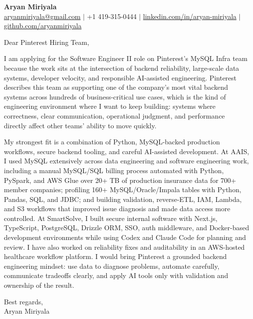 \documentclass[11pt]{letter}
\begin{document}
\begin{center}
{\Large \textbf{Aryan Miriyala}}\\
\href{mailto:aryanmiriyala@gmail.com}{aryanmiriyala@gmail.com} $|$ +1 419-315-0444 $|$
\href{https://www.linkedin.com/in/aryan-miriyala-7788a21b6/}{linkedin.com/in/aryan-miriyala} $|$
\href{https://github.com/aryanmiriyala}{github.com/aryanmiriyala}
\end{center}

\vspace{0.25in}

Dear Pinterest Hiring Team,

I am applying for the Software Engineer II role on Pinterest's MySQL Infra team because the work sits at the intersection of backend reliability, large-scale data systems, developer velocity, and responsible AI-assisted engineering. Pinterest describes this team as supporting one of the company's most vital backend systems across hundreds of business-critical use cases, which is the kind of engineering environment where I want to keep building: systems where correctness, clear communication, operational judgment, and performance directly affect other teams' ability to move quickly.

My strongest fit is a combination of Python, MySQL-backed production workflows, secure backend tooling, and careful AI-assisted development. At AAIS, I used MySQL extensively across data engineering and software engineering work, including a manual MySQL/SQL billing process automated with Python, PySpark, and AWS Glue over 20+ TB of production insurance data for 700+ member companies; profiling 160+ MySQL/Oracle/Impala tables with Python, Pandas, SQL, and JDBC; and building validation, reverse-ETL, IAM, Lambda, and S3 workflows that improved issue diagnosis and made data access more controlled. At SmartSolve, I built secure internal software with Next.js, TypeScript, PostgreSQL, Drizzle ORM, SSO, auth middleware, and Docker-based development environments while using Codex and Claude Code for planning and review. I have also worked on reliability fixes and auditability in an AWS-hosted healthcare workflow platform. I would bring Pinterest a grounded backend engineering mindset: use data to diagnose problems, automate carefully, communicate tradeoffs clearly, and apply AI tools only with validation and ownership of the result.

\vspace{0.15in}

Best regards,\\
Aryan Miriyala
\end{document}
